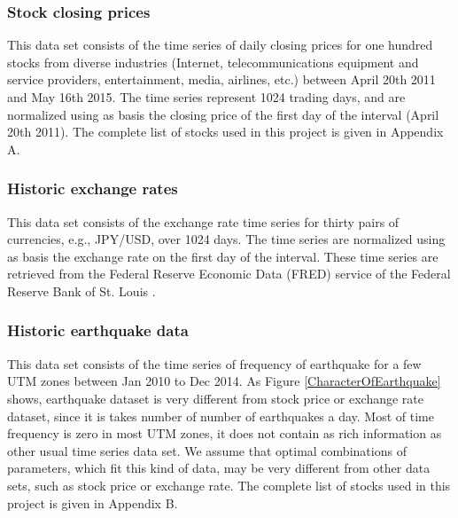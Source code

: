\documentclass{article}
\begin{document}
\subsubsection{Stock closing prices}

This data set consists of the time series of daily closing prices for one hundred stocks from diverse industries (Internet, telecommunications equipment and service providers, entertainment, media, airlines, etc.) between April 20th 2011 and May 16th 2015. The time series represent 1024 trading days, and are normalized using as basis the closing price of the first day of the interval (April 20th 2011). The complete list of stocks used in this project is given in Appendix A.

\subsubsection{Historic exchange rates}

This data set consists of the exchange rate time series for thirty pairs of currencies, e.g., JPY/USD, over 1024 days. The time series are normalized using as basis the exchange rate on the first day of the interval. These time series are retrieved from the Federal Reserve Economic Data (FRED) service of the Federal Reserve Bank of St. Louis \cite{FRED15}.


\subsubsection{Historic earthquake data}
This data set consists of the time series of frequency of earthquake for a few UTM zones between Jan 2010 to Dec 2014. As Figure \ref{CharacterOfEarthquake} shows, earthquake dataset is very different from stock price or exchange rate dataset, since it is takes number of number of earthquakes a day. Most of time frequency is zero in most UTM zones, it does not contain as rich information as other usual time series data set. We assume that optimal combinations of parameters, which fit this kind of data, may be very different from other data sets, such as stock price or exchange rate. The complete list of stocks used in this project is given in Appendix B.
\end{document}
